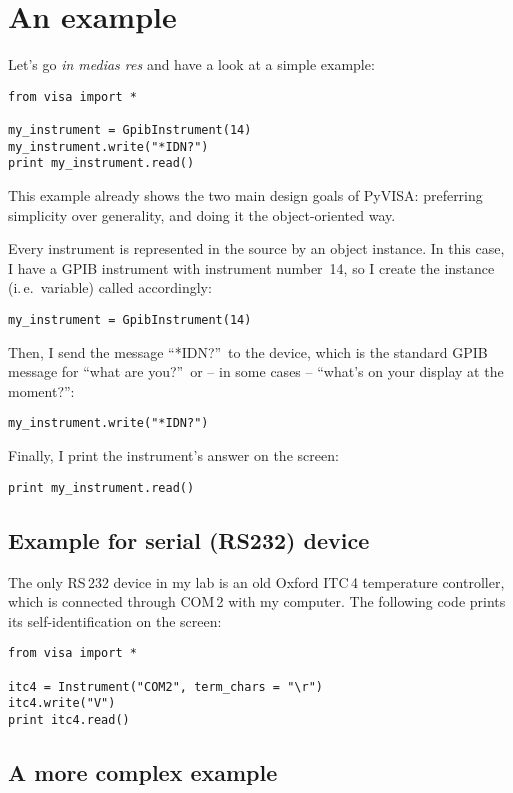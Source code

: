 \documentclass{howto}
\begin{document}
\section{An example}

Let's go \emph{in medias res} and have a look at a simple example:
\begin{verbatim}
from visa import *

my_instrument = GpibInstrument(14)
my_instrument.write("*IDN?")
print my_instrument.read()
\end{verbatim}
This example already shows the two main design goals of PyVISA: preferring
simplicity over generality, and doing it the object-oriented way.

Every instrument is represented in the source by an object instance.  In this case,
I have a GPIB instrument with instrument number~14, so I create the instance
(i.\,e.\ variable) called  accordingly:
\begin{verbatim}
my_instrument = GpibInstrument(14)
\end{verbatim}
Then, I send the message ``*IDN?''\ to the device, which is the standard GPIB
message for ``what are you?''\ or -- in some cases -- ``what's on your display
at the moment?'':
\begin{verbatim}
my_instrument.write("*IDN?")
\end{verbatim}
Finally, I print the instrument's answer on the screen:
\begin{verbatim}
print my_instrument.read()
\end{verbatim}


\subsection{Example for serial (RS232) device}

The only RS\,232 device in my lab is an old Oxford ITC\,4 temperature
controller, which is connected through COM\,2 with my computer.  The following
code prints its self-identification on the screen:
\begin{verbatim}
from visa import *

itc4 = Instrument("COM2", term_chars = "\r")
itc4.write("V")
print itc4.read()
\end{verbatim}


\subsection{A more complex example}
\label{sec:more-complex-example}
\end{document}
